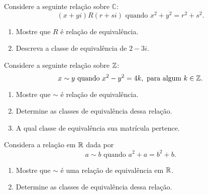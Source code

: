 \documentclass[12pt]{exam}
\begin{document}




    \vspace{.3cm}

    \questao{} Considere a seguinte rela{\c c}{\~a}o sobre $\mathbb{C}$:
    \[
        (x+yi) R (r+si) \mbox{ quando } x^2+y^2=r^2+s^2.
    \]
    \begin{enumerate}[label={\alph*})]
        \item Mostre que $R$ {\'e} rela{\c c}{\~a}o de equival{\^e}ncia.

        \item Descreva a classe de equival{\^e}ncia de $2 - 3i$.
    \end{enumerate}

    \vspace{.3cm}

    \questao{} Considere a seguinte rela\c{c}\~ao sobre $\mathbb{Z}$:
    \[
        x \sim y \mbox{ quando }  x^2 - y^2 = 4k, \mbox{ para algum } k \in \mathbb{Z}.
    \]

    \begin{enumerate}[label={\alph*})]
        \item Mostre que $\sim$ {\'e} rela{\c c}{\~a}o de equival{\^e}ncia.

        \item Determine as classes de equivalência dessa relação.

        \item A qual classe de equivalência sua matrícula pertence.
    \end{enumerate}

    \vspace{.3cm}

    \questao{} Considera a rela\c{c}\~ao em $\mathbb{R}$ dada por
    \[
        a \sim b \mbox{ quando } a^2 + a = b^2 + b.
    \]
    \begin{enumerate}[label={\alph*})]
        \item Mostre que $\sim$ \'e uma rela\c{c}\~ao de equival\^encia em $\mathbb{R}$.

        \item Determine as classes de equival\^encia dessa rela\c{c}\~ao.
    \end{enumerate}
\end{document}
